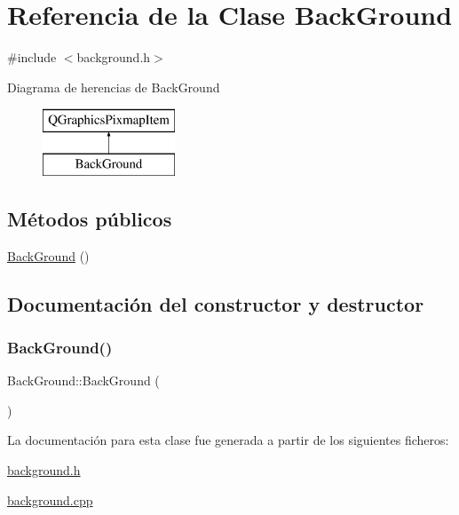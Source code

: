 \hypertarget{class_back_ground}{}\section{Referencia de la Clase Back\+Ground}
\label{class_back_ground}


{\ttfamily \#include $<$background.\+h$>$}

Diagrama de herencias de Back\+Ground\begin{figure}[H]
\begin{center}
\leavevmode
\includegraphics[height=2.000000cm]{class_back_ground}
\end{center}
\end{figure}
\subsection*{Métodos públicos}
\begin{DoxyCompactItemize}
\item 
\hyperlink{class_back_ground_a6a3fe7aa2ec8d57d372d336cd2d64337}{Back\+Ground} ()
\end{DoxyCompactItemize}


\subsection{Documentación del constructor y destructor}
\hypertarget{class_back_ground_a6a3fe7aa2ec8d57d372d336cd2d64337}{}\label{class_back_ground_a6a3fe7aa2ec8d57d372d336cd2d64337} 
\subsubsection{\texorpdfstring{Back\+Ground()}{BackGround()}}
{\footnotesize\ttfamily Back\+Ground\+::\+Back\+Ground (\begin{DoxyParamCaption}{ }\end{DoxyParamCaption})}



La documentación para esta clase fue generada a partir de los siguientes ficheros\+:\begin{DoxyCompactItemize}
\item 
\hyperlink{background_8h}{background.\+h}\item 
\hyperlink{background_8cpp}{background.\+cpp}\end{DoxyCompactItemize}
